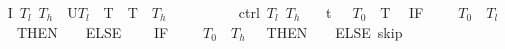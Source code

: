 \documentclass[envcountsame,envcountsect]{llncs}
\begin{document}
\begin{example}
\begin{isabellebody}
\isanewline
{}\ 
{\isachardoublequoteopen}I\ $T_l$\ $T_h$\ {\isasymequiv}\ U{\isacharparenleft}$T_l$\ {\isasymle}\ T\ {\isasymand}\ T\ {\isasymle}\ $T_h$\ {\isasymand}\ {\isacharparenleft}{\isasymtheta}\ {\isacharequal}\ {}\ {\isasymor}\ {\isasymtheta}\ {\isacharequal}\ {}{\isacharparenright}{\isacharparenright}{\isachardoublequoteclose}\isanewline
\isanewline
{}\ %
{\isachardoublequoteopen}ctrl\ $T_l$\ $T_h$\ {\isasymequiv}\isanewline 
\ \ {\isacharparenleft}t\ {\isacharcolon}{\isacharcolon}{\isacharequal}\ {}{\isacharparenright}{\isacharsemicolon}\ {\isacharparenleft}$T_0$\ {\isacharcolon}{\isacharcolon}{\isacharequal}\ T{\isacharparenright}{\isacharsemicolon}\isanewline
\ \ {\isacharparenleft}IF\ {\isacharparenleft}{\isasymtheta}\ {\isacharequal}\ {\isadigit{0}}\ {\isasymand}\ $T_0$\ {\isasymle}\ $T_l$\ {\isacharplus}\ {}{\isacharparenright}\ THEN\ {\isacharparenleft}{\isasymtheta}\ {\isacharcolon}{\isacharcolon}{\isacharequal}\ {}{\isacharparenright}\ ELSE\ \isanewline
\ \ \ IF\ {\isacharparenleft}{\isasymtheta}\ {\isacharequal}\ {\isadigit{1}}\ {\isasymand}\ $T_0$\ {\isasymge}\ $T_h$\ {\isacharminus}\ {\isadigit{1}}{\isacharparenright}\ THEN\ {\isacharparenleft}{\isasymtheta}\ {\isacharcolon}{\isacharcolon}{\isacharequal}\ {\isadigit{0}}{\isacharparenright}\ ELSE\ skip{\isacharparenright}{\isachardoublequoteclose}\isanewline
\isanewline
{}\ %

\end{isabellebody}
\end{example}
\end{document}
